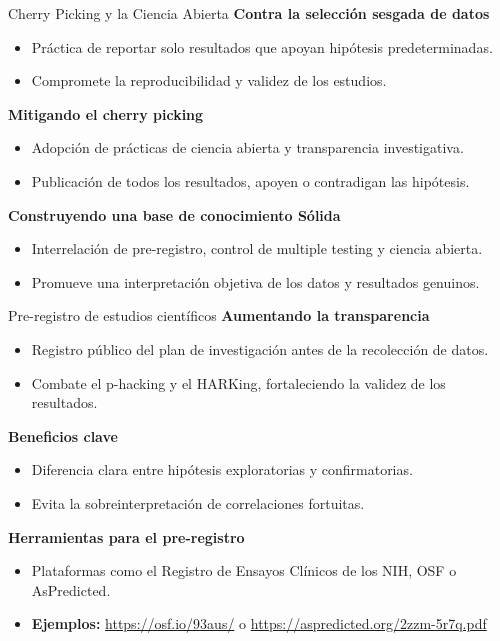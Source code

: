 ﻿\documentclass{beamer}
\begin{document}
\begin{frame}{Cherry Picking y la Ciencia Abierta}
    \textbf{Contra la selección sesgada de datos}
    \begin{itemize}
        \item Práctica de reportar solo resultados que apoyan hipótesis predeterminadas.
        \item Compromete la reproducibilidad y validez de los estudios.
    \end{itemize}

    \textbf{Mitigando el cherry picking}
    \begin{itemize}
        \item Adopción de prácticas de ciencia abierta y transparencia investigativa.
        \item Publicación de todos los resultados, apoyen o contradigan las hipótesis.
    \end{itemize}

    \textbf{Construyendo una base de conocimiento Sólida}
    \begin{itemize}
        \item Interrelación de pre-registro, control de multiple testing y ciencia abierta.
        \item Promueve una interpretación objetiva de los datos y resultados genuinos.
    \end{itemize}
\end{frame}

\begin{frame}{Pre-registro de estudios científicos}
    \textbf{Aumentando la transparencia}
    \begin{itemize}
        \item Registro público del plan de investigación antes de la recolección de datos.
        \item Combate el p-hacking y el HARKing, fortaleciendo la validez de los resultados.
    \end{itemize}

    \textbf{Beneficios clave}
    \begin{itemize}
        \item Diferencia clara entre hipótesis exploratorias y confirmatorias.
        \item Evita la sobreinterpretación de correlaciones fortuitas.
    \end{itemize}

    \textbf{Herramientas para el pre-registro}
    \begin{itemize}
        \item Plataformas como el Registro de Ensayos Clínicos de los NIH, OSF o AsPredicted.
        \item \textbf{Ejemplos:} \url{https://osf.io/93aus/} o \url{https://aspredicted.org/2zzm-5r7q.pdf}
    \end{itemize}
\end{frame}
\end{document}
